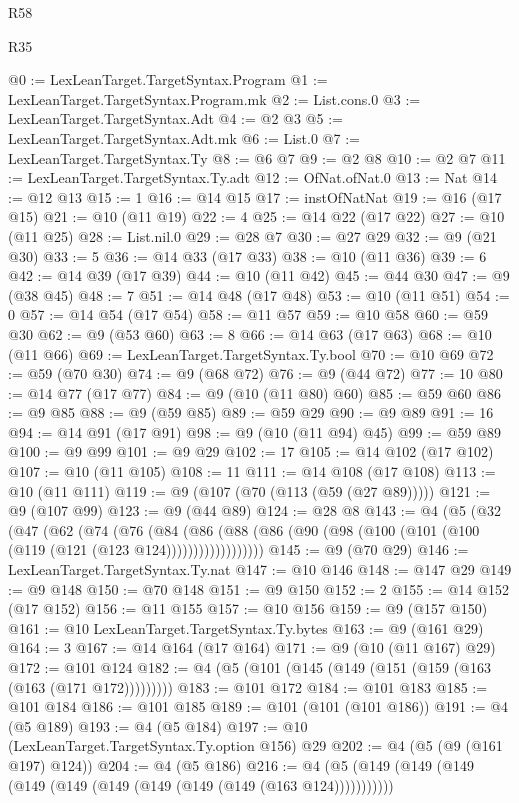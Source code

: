 \begin{lexlean}{R58}
\begin{lexlean}{R35}
\begin{coremodule}
{{{{{{{{{{{{{{{{{{{{{{{{{{{{{{{{{{{{{{{{{{{{{{{{{{{{@0 := LexLeanTarget.TargetSyntax.Program
@1 := LexLeanTarget.TargetSyntax.Program.mk
@2 := List.cons.{0}
@3 := LexLeanTarget.TargetSyntax.Adt
@4 := @2 @3
@5 := LexLeanTarget.TargetSyntax.Adt.mk
@6 := List.{0}
@7 := LexLeanTarget.TargetSyntax.Ty
@8 := @6 @7
@9 := @2 @8
@10 := @2 @7
@11 := LexLeanTarget.TargetSyntax.Ty.adt
@12 := OfNat.ofNat.{0}
@13 := Nat
@14 := @12 @13
@15 := 1
@16 := @14 @15
@17 := instOfNatNat
@19 := @16 (@17 @15)
@21 := @10 (@11 @19)
@22 := 4
@25 := @14 @22 (@17 @22)
@27 := @10 (@11 @25)
@28 := List.nil.{0}
@29 := @28 @7
@30 := @27 @29
@32 := @9 (@21 @30)
@33 := 5
@36 := @14 @33 (@17 @33)
@38 := @10 (@11 @36)
@39 := 6
@42 := @14 @39 (@17 @39)
@44 := @10 (@11 @42)
@45 := @44 @30
@47 := @9 (@38 @45)
@48 := 7
@51 := @14 @48 (@17 @48)
@53 := @10 (@11 @51)
@54 := 0
@57 := @14 @54 (@17 @54)
@58 := @11 @57
@59 := @10 @58
@60 := @59 @30
@62 := @9 (@53 @60)
@63 := 8
@66 := @14 @63 (@17 @63)
@68 := @10 (@11 @66)
@69 := LexLeanTarget.TargetSyntax.Ty.bool
@70 := @10 @69
@72 := @59 (@70 @30)
@74 := @9 (@68 @72)
@76 := @9 (@44 @72)
@77 := 10
@80 := @14 @77 (@17 @77)
@84 := @9 (@10 (@11 @80) @60)
@85 := @59 @60
@86 := @9 @85
@88 := @9 (@59 @85)
@89 := @59 @29
@90 := @9 @89
@91 := 16
@94 := @14 @91 (@17 @91)
@98 := @9 (@10 (@11 @94) @45)
@99 := @59 @89
@100 := @9 @99
@101 := @9 @29
@102 := 17
@105 := @14 @102 (@17 @102)
@107 := @10 (@11 @105)
@108 := 11
@111 := @14 @108 (@17 @108)
@113 := @10 (@11 @111)
@119 := @9 (@107 (@70 (@113 (@59 (@27 @89)))))
@121 := @9 (@107 @99)
@123 := @9 (@44 @89)
@124 := @28 @8
@143 := @4
    (@5
      (@32
        (@47
          (@62
            (@74
              (@76
                (@84
                  (@86
                    (@88 (@86 (@90 (@98 (@100 (@101 (@100 (@119 (@121 (@123 @124))))))))))))))))))
@145 := @9 (@70 @29)
@146 := LexLeanTarget.TargetSyntax.Ty.nat
@147 := @10 @146
@148 := @147 @29
@149 := @9 @148
@150 := @70 @148
@151 := @9 @150
@152 := 2
@155 := @14 @152 (@17 @152)
@156 := @11 @155
@157 := @10 @156
@159 := @9 (@157 @150)
@161 := @10 LexLeanTarget.TargetSyntax.Ty.bytes
@163 := @9 (@161 @29)
@164 := 3
@167 := @14 @164 (@17 @164)
@171 := @9 (@10 (@11 @167) @29)
@172 := @101 @124
@182 := @4 (@5 (@101 (@145 (@149 (@151 (@159 (@163 (@163 (@171 @172)))))))))
@183 := @101 @172
@184 := @101 @183
@185 := @101 @184
@186 := @101 @185
@189 := @101 (@101 (@101 @186))
@191 := @4 (@5 @189)
@193 := @4 (@5 @184)
@197 := @10 (LexLeanTarget.TargetSyntax.Ty.option @156) @29
@202 := @4 (@5 (@9 (@161 @197) @124))
@204 := @4 (@5 @186)
@216 := @4 (@5 (@149 (@149 (@149 (@149 (@149 (@149 (@149 (@149 (@149 (@163 @124)))))))))))
}}}}}}}}}}}}}}}}}}}}}}}}}}}}}}}}}}}}}}}}}}}}}}}}}}}}
\end{coremodule}
\end{lexlean}
\end{lexlean}
